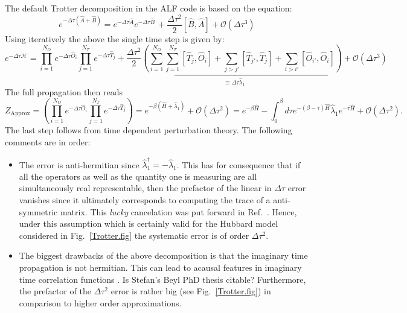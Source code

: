 The default   Trotter decomposition in the ALF code is  based on the equation: 
\begin{equation}
	e^{ -\Delta \tau \left( \hat{A} + \hat{B} \right)  }  =  e^{ -\Delta \tau \hat{A}}  e^{ -\Delta \tau  \hat{B} \  }   +  \frac{\Delta  \tau^2}{2} \left[ \hat{B}, \hat{A} \right] + \mathcal{O} \left (\Delta \tau ^3 \right) 
\end{equation}
Using   iteratively the above  the single time step is given by: 
\begin{equation}
    e^{-\Delta \tau \mathcal{H}}    =   \prod_{i=1}^{N_O} e^{-\Delta \tau \hat{O}_i} \prod_{j=1}^{N_T} e^{-\Delta \tau \hat{T}_j}  +  \underbrace{ \frac{\Delta \tau^2}{2} 
    \left(   \sum_{i=1}^{N_O}  \sum_{j=1}^{N_T} \left[ \hat{T}_j, \hat{O}_i \right]  +   \sum_{j>j'}  \left[ \hat{T}_{j'}, \hat{T}_j \right]
    +   \sum_{i>i'}  \left[ \hat{O}_{i'}, \hat{O}_i \right]
      \right) }_{\equiv \Delta \tau \hat{\lambda}_1}   + \mathcal{O} \left( \Delta \tau^3 \right)
\end{equation}
The full propagation   then reads
\begin{equation}
  Z_{\text{Approx}} =  \left(\prod_{i=1}^{N_O} e^{-\Delta \tau \hat{O}_i} \prod_{j=1}^{N_T} e^{-\Delta \tau \hat{T}_j}  \right)   = e^{-\beta \left(  \hat{H} + \hat{\lambda}_1 \right)} 
  + \mathcal{O} \left( \Delta \tau^2 \right)
  =  e^{-\beta  \hat{H}  }  - 
	 \int_0^{\beta}  d \tau  e^{-(\beta-\tau )\hat{H}} \hat{\lambda}_1  e^{-\tau \hat{H}}   +  \mathcal{O} (\Delta \tau^2 ).
\end{equation}
The last step follows from time dependent perturbation theory. 
The following comments are in order:
\begin{itemize}
\item    The error is anti-hermitian  since $\hat{\lambda}_1^{\dagger} = - \hat{\lambda}_1 $.  This has for consequence that if all the operators as well as  the quantity one is measuring are all  simultaneously real representable,  then   the prefactor of the linear in $\Delta  \tau$ error vanishes since it ultimately corresponds to computing the trace of a  anti-symmetric matrix. This \textit{lucky}   cancelation was put forward in  Ref.~\cite{Fye86}.   Hence, under this assumption which is certainly valid for the Hubbard model considered in Fig.~\ref{Trotter.fig}   the systematic error is of order $\Delta \tau^2$. 
\item   The biggest drawbacks  of the above decomposition is that  the imaginary time propagation is not hermitian.   This can lead to acausal  features in imaginary time   correlation functions \cite{Beyl_thesis}. { \color{red} Is Stefan's Beyl PhD thesis citable?}  Furthermore, the  prefactor of the $\Delta \tau^2$ error is rather big (see Fig.~\ref{Trotter.fig})  in comparison to higher order approximations. 
\end{itemize}


